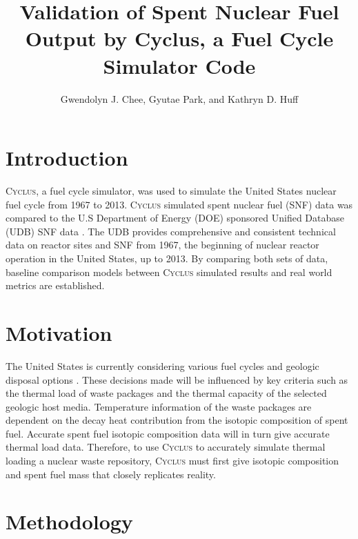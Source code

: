 \documentclass{anstrans}
\title{Validation of Spent Nuclear Fuel Output by Cyclus, a Fuel Cycle Simulator Code}
\author{Gwendolyn J. Chee, Gyutae Park, and Kathryn D. Huff}
\institute{
Dept. of Nuclear, Plasma and Radiological Engineering, University of Illinois at Urbana-Champaign \\
gchee2@illinois.edu
}
\newcommand{\Cyclus}{\textsc{Cyclus}\xspace}%
\begin{document}
\section{Introduction}
\Cyclus \cite{huff_fundamentals_2016}, a fuel cycle simulator, was used to simulate the
United States nuclear fuel cycle from 1967 to 2013. \Cyclus simulated spent nuclear fuel (SNF) data was compared to the U.S Department of Energy (DOE) sponsored Unified Database (UDB) SNF data \cite{Peterson_UNF_2017}. The UDB provides comprehensive and consistent technical data on reactor sites and SNF from 1967, the beginning of nuclear reactor operation in the United States, up to 2013. By comparing both sets of data, baseline comparison models between \Cyclus simulated results and real world metrics are established. 

\section{Motivation}
The United States is currently considering various fuel cycles and geologic disposal options \cite{DOE_strategy_2013}. These decisions made will be influenced by key criteria such as the thermal load of waste packages and the thermal capacity of the selected geologic host media. Temperature information of the waste packages are dependent on the decay heat contribution from the isotopic composition of spent fuel. Accurate spent fuel isotopic composition data will in turn give accurate thermal load data. Therefore, to use \Cyclus to accurately simulate thermal loading a nuclear waste repository, \Cyclus must first give isotopic composition and spent fuel mass that closely replicates reality. 

\section{Methodology} %
\end{document}
